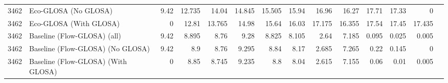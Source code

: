 \begin{table}[ht]
{\begin{tabular}{llrrrrrrrrrrrr}
        3462 & Eco-GLOSA (No GLOSA)               & 9.42 & 12.735 & 14.04 & 14.845 & 15.505 & 15.94 & 16.96 & 16.27 & 17.71 & 17.33 & 0 \\
        3462 & Eco-GLOSA (With GLOSA)             & 0 & 12.81 & 13.765 & 14.98 & 15.64 & 16.03 & 17.175 & 16.355 & 17.54 & 17.45 & 17.435 \\
        3462 & Baseline (Flow-GLOSA) (all)        & 9.42 & 8.895 & 8.76 & 9.28 & 8.825 & 8.105 & 2.64 & 7.185 & 0.095 & 0.025 & 0.005 \\
        3462 & Baseline (Flow-GLOSA) (No GLOSA)   & 9.42 & 8.9 & 8.76 & 9.295 & 8.84 & 8.17 & 2.685 & 7.265 & 0.22 & 0.145 & 0 \\
        3462 & Baseline (Flow-GLOSA) (With GLOSA) & 0 & 8.85 & 8.745 & 9.235 & 8.8 & 8.04 & 2.615 & 7.155 & 0.06 & 0.01 & 0.005 \\
        \bottomrule
      \end{tabular}
    }
\end{table}

